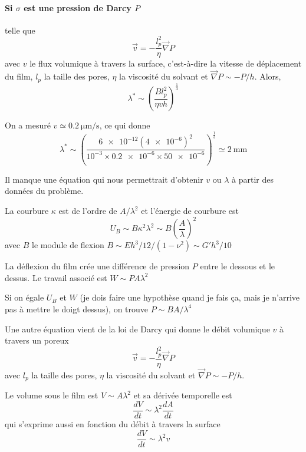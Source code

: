 \documentclass[12pt,a4paper]{article}
\begin{document}
\paragraph*{Si $\sigma$ est une pression de Darcy $P$} telle que 
\begin{equation}
\vec{v} = - \frac{l_p^2}{\eta}  \vec{\nabla} P
\label{eq:Darcy}
\end{equation}
avec $v$ le flux volumique à travers la surface, c'est-à-dire la vitesse de déplacement du film, $l_p$ la taille des pores, $\eta$ la viscosité du solvant et $\vec{\nabla} P \sim -P/h$. Alors,
\begin{equation}
\lambda^* \sim \left(\frac{B l_p^2}{\eta v h}\right)^\frac{1}{3}
\end{equation}

On a mesuré $v\simeq \SI{0.2}{\micro\metre\per\second}$, ce qui donne 
\begin{equation}
\lambda^* \sim \left(\frac{\num{6e-12} (\num{4e-6})^2}{10^{-3} \times \num{0.2e-6} \times \num{50e-6}}\right)^\frac{1}{3} \simeq \SI{2}{\milli\metre}
\end{equation}

Il manque une équation qui nous permettrait d'obtenir $v$ ou $\lambda$ à partir des données du problème.

\pagebreak

La courbure $\kappa$ est de l'ordre de $A/\lambda^2$ et l'énergie de courbure est
\begin{equation}
U_B \sim B  \kappa^2  \lambda^2 \sim B  \left(\frac{A}{\lambda}\right)^2
\end{equation}
avec $B$ le module de flexion $B \sim E h^3 /12 / (1-\nu^2) \sim G' h^3/10$

La déflexion du film crée une différence de pression $P$ entre le dessous et le dessus. Le travail associé est $W \sim P  A  \lambda^2$

Si on égale $U_B$ et $W$ (je dois faire une hypothèse quand je fais ça, mais je n'arrive pas à mettre le doigt dessus), on trouve $P \sim BA/\lambda^4$

Une autre équation vient de la loi de Darcy qui donne le débit volumique $v$ à travers un poreux 
\begin{equation}
\vec{v} = - \frac{l_p^2}{\eta}  \vec{\nabla} P
\label{eq:Darcy}
\end{equation}
avec $l_p$ la taille des pores, $\eta$ la viscosité du solvant et $\vec{\nabla} P \sim -P/h$.

Le volume sous le film est $V \sim A \lambda^2$ et sa dérivée temporelle est
\begin{equation}
\frac{dV}{dt} \sim \lambda^2  \frac{dA}{dt}
\label{eq:var_vol}
\end{equation}
qui s'exprime aussi en fonction du débit à travers la surface
\begin{equation}
\frac{dV}{dt} \sim \lambda^2  v
\label{eq:debit}
\end{equation}
\end{document}
